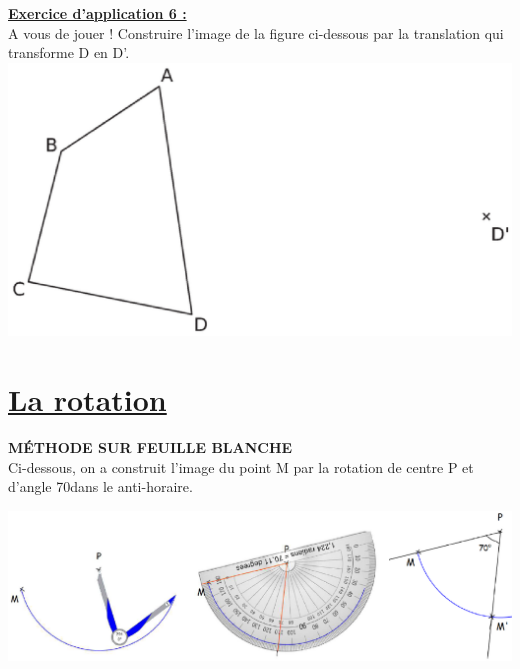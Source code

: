 \documentclass[a4paper,11pt]{article}
\newcommand{\textding}[1]{\text{\ding{#1}}}
\begin{document}
\textbf{\underline{Exercice d'application 6 :}}\\
A vous de jouer ! Construire l'image de la figure ci-dessous par la translation qui transforme D en D'.\\
\includegraphics[scale=0.69]{translation2.eps} 





\section{\underline{La rotation}}


 \textding{48} \textbf{MÉTHODE SUR FEUILLE BLANCHE}\\
 
Ci-dessous, on a construit l'image du point M par la rotation de centre P et d'angle 70\degre dans le anti-horaire.
\begin{flushleft}
\includegraphics[scale=0.85]{rotation1.eps} 
\end{flushleft}

\newpage
\end{document}
